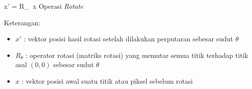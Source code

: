 \vspace{0.5\baselineskip}
\begin{equationcaptioned}[eq:2.operasi]{
		{x}' = {R}_\theta \, {x}
	}{
		Operasi \textit{Rotate}
	}
\end{equationcaptioned}

Keterangan:
\begin{itemize}
\renewcommand\labelitemi{} %
	\item ${x}'$ : vektor posisi hasil rotasi setelah dilakukan perputaran sebesar sudut $\theta$
    \item ${R}_\theta$ : operator rotasi (matriks rotasi) yang memutar semua titik terhadap titik asal $(0,0)$ sebesar sudut $\theta$
    \item ${x}$ : vektor posisi awal suatu titik atau piksel sebelum rotasi
\end{itemize}






